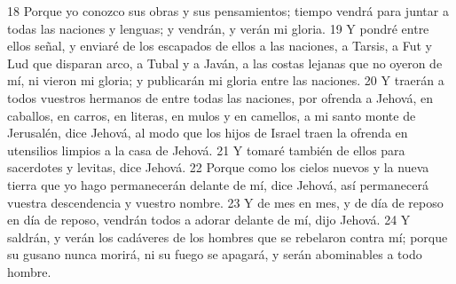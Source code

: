 18 Porque yo conozco sus obras y sus pensamientos; tiempo vendrá para juntar a todas las naciones y lenguas; y vendrán, y verán mi gloria.
19 Y pondré entre ellos señal, y enviaré de los escapados de ellos a las naciones, a Tarsis, a Fut y Lud que disparan arco, a Tubal y a Javán, a las costas lejanas que no oyeron de mí, ni vieron mi gloria; y publicarán mi gloria entre las naciones.
20 Y traerán a todos vuestros hermanos de entre todas las naciones, por ofrenda a Jehová, en caballos, en carros, en literas, en mulos y en camellos, a mi santo monte de Jerusalén, dice Jehová, al modo que los hijos de Israel traen la ofrenda en utensilios limpios a la casa de Jehová.
21 Y tomaré también de ellos para sacerdotes y levitas, dice Jehová.
22 Porque como los cielos nuevos y la nueva tierra que yo hago permanecerán delante de mí, dice Jehová, así permanecerá vuestra descendencia y vuestro nombre.
23 Y de mes en mes, y de día de reposo en día de reposo, vendrán todos a adorar delante de mí, dijo Jehová.
24 Y saldrán, y verán los cadáveres de los hombres que se rebelaron contra mí; porque su gusano nunca morirá, ni su fuego se apagará, y serán abominables a todo hombre. 


